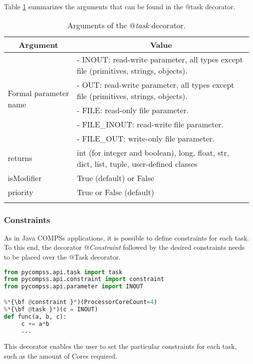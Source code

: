 Table \ref{tab:task_decorator_arguments} summarizes the arguments that can be found in the $@$task decorator.
\bgroup
  \def\arraystretch{1.5}%
  \begin{longtable}{| p{} | p{} |}
    \hline
    \multicolumn{1}{|c|}{{\bf Argument }}    &  \multicolumn{1}{c|}{{\bf Value }}\\
    \hline
    \multirow{5}{*}{Formal parameter name}  &  - INOUT: read-write parameter, all types except file (primitives, strings, objects). \\
    & - OUT: read-write parameter, all types except file (primitives, strings, objects). \\
    & - FILE: read-only file parameter. \\
    & - FILE\_INOUT: read-write file parameter. \\
    & - FILE\_OUT: write-only file parameter. \\
    \hline
    returns & int (for integer and boolean), long, float, str, dict, list, tuple, user-defined classes \\
    \hline
    isModifier &  True (default) or False \\
    \hline
    priority  & True or False (default) \\
    \hline
    \caption{Arguments of the {\it $@$task} decorator.}
    \label{tab:task_decorator_arguments}
  \end{longtable}
\egroup


\subsubsection{Constraints}

As in Java COMPSs applications, it is possible to define constraints for each task.
To this end, the decorator {\it $@$Constraint} followed by the desired constraints needs to be placed over the $@$Task decorator.

\begin{lstlisting}[language=python]
from pycompss.api.task import task
from pycompss.api.constraint import constraint
from pycompss.api.parameter import INOUT

%*{\bf @constraint }*)(ProcessorCoreCount=4)
%*{\bf @task }*)(c = INOUT)
def func(a, b, c):
     c += a*b
     ...
\end{lstlisting}

This decorator enables the user to set the particular constraints for each task, such as the amount of Cores required.

